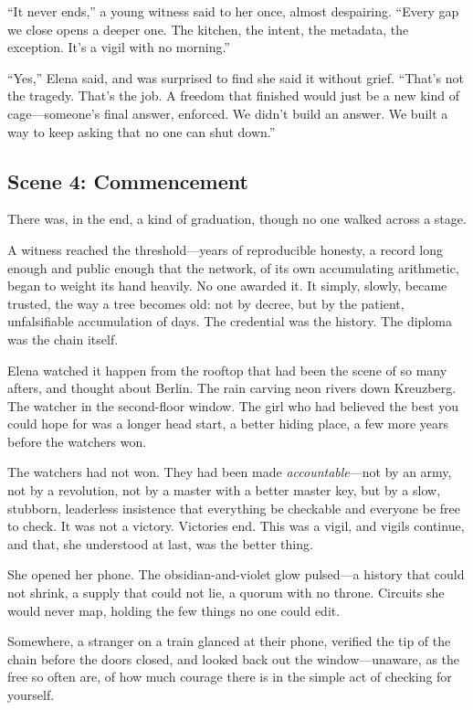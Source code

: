 \documentclass[12pt,letterpaper]{book}
\begin{document}
``It never ends,'' a young witness said to her once, almost despairing. ``Every
gap we close opens a deeper one. The kitchen, the intent, the metadata, the
exception. It's a vigil with no morning.''

``Yes,'' Elena said, and was surprised to find she said it without grief. ``That's
not the tragedy. That's the job. A freedom that finished would just be a new kind
of cage---someone's final answer, enforced. We didn't build an answer. We built a
way to keep asking that no one can shut down.''

\hypertarget{scene-4-commencement}{%
\subsection{Scene 4:
Commencement}\label{scene-4-commencement}}

There was, in the end, a kind of graduation, though no one walked across a stage.

A witness reached the threshold---years of reproducible honesty, a record long
enough and public enough that the network, of its own accumulating arithmetic,
began to weight its hand heavily. No one awarded it. It simply, slowly, became
trusted, the way a tree becomes old: not by decree, but by the patient,
unfalsifiable accumulation of days. The credential was the history. The diploma
was the chain itself.

Elena watched it happen from the rooftop that had been the scene of so many
afters, and thought about Berlin. The rain carving neon rivers down Kreuzberg. The
watcher in the second-floor window. The girl who had believed the best you could
hope for was a longer head start, a better hiding place, a few more years before
the watchers won.

The watchers had not won. They had been made \emph{accountable}---not by an army,
not by a revolution, not by a master with a better master key, but by a slow,
stubborn, leaderless insistence that everything be checkable and everyone be free
to check. It was not a victory. Victories end. This was a vigil, and vigils
continue, and that, she understood at last, was the better thing.

She opened her phone. The obsidian-and-violet glow pulsed---a history that could
not shrink, a supply that could not lie, a quorum with no throne. Circuits she
would never map, holding the few things no one could edit.

Somewhere, a stranger on a train glanced at their phone, verified the tip of the
chain before the doors closed, and looked back out the window---unaware, as the
free so often are, of how much courage there is in the simple act of checking for
yourself.
\end{document}

